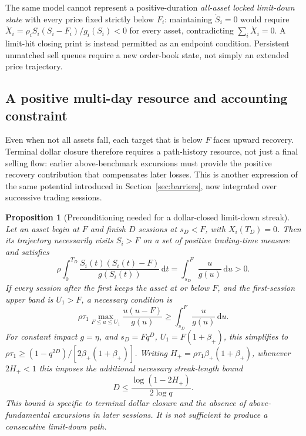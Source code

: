 \documentclass[11pt]{article}
\numberwithin{equation}{section}
\newtheorem{proposition}[theorem]{Proposition}
\theoremstyle{definition}
\theoremstyle{remark}
\newcommand{\dd}{\,\mathrm{d}}
\begin{document}
The same model cannot represent a positive-duration \emph{all-asset locked limit-down state} with every price fixed strictly below $F_i$: maintaining $\dot S_i=0$ would require
$\dot X_i=\rho_i S_i(S_i-F_i)/g_i(S_i)<0$ for every asset, contradicting $\sum_i\dot X_i=0$. A limit-hit closing print is instead permitted as an endpoint condition. Persistent unmatched sell queues require a new order-book state, not simply an extended price trajectory.

\subsection{A positive multi-day resource and accounting constraint}\label{subsec:multiday-preconditioning}
Even when not all assets fall, each target that is below $F$ faces upward recovery. Terminal dollar closure therefore requires a path-history resource, not just a final selling flow: earlier above-benchmark excursions must provide the positive recovery contribution that compensates later losses. This is another expression of the same potential introduced in Section~\ref{sec:barriers}, now integrated over successive trading sessions.
\begin{proposition}[Preconditioning needed for a dollar-closed limit-down streak]\label{prop:streak-precondition}
Let an asset begin at $F$ and finish $D$ sessions at $s_D<F$, with $X_i(T_D)=0$. Then its trajectory necessarily visits $S_i>F$ on a set of positive trading-time measure and satisfies
\begin{equation}\label{eq:streak-excursion}
 \rho\int_0^{T_D}\frac{S_i(t)(S_i(t)-F)}{g(S_i(t))}\dd t
 =\int_{s_D}^{F}\frac{u}{g(u)}\dd u>0.
\end{equation}
If every session after the first keeps the asset at or below $F$, and the first-session upper band is $U_1>F$, a necessary condition is
\begin{equation}\label{eq:streak-precondition}
 \boxed{\quad \rho\tau_1\max_{F\le u\le U_1}\frac{u(u-F)}{g(u)}
 \ge \int_{s_D}^{F}\frac{u}{g(u)}\dd u.\quad}
\end{equation}
For constant impact $g=\eta$, and $s_D=Fq^D$, $U_1=F(1+\beta_+)$, this simplifies to
$\rho\tau_1\ge(1-q^{2D})/[2\beta_+(1+\beta_+)]$.
Writing $H_+=\rho\tau_1\beta_+(1+\beta_+)$, whenever $2H_+<1$ this imposes the additional necessary streak-length bound
\begin{equation}\label{eq:multiday-preconditioning-D}
\boxed{\quad D\le \frac{\log(1-2H_+)}{2\log q}.\quad}
\end{equation}
This bound is specific to terminal dollar closure and the absence of above-fundamental excursions in later sessions. It is not sufficient to produce a consecutive limit-down path.
\end{proposition}
\end{document}
